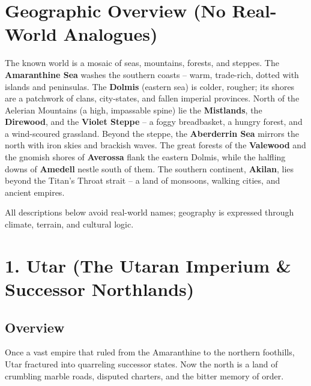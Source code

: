 \documentclass[11pt]{article}
\begin{document}
\section*{Geographic Overview (No Real-World Analogues)}
The known world is a mosaic of seas, mountains, forests, and steppes.  
The \textbf{Amaranthine Sea} washes the southern coasts -- warm, trade-rich, dotted with islands and peninsulas.  
The \textbf{Dolmis} (eastern sea) is colder, rougher; its shores are a patchwork of clans, city-states, and fallen imperial provinces.  
North of the Aelerian Mountains (a high, impassable spine) lie the \textbf{Mistlands}, the \textbf{Direwood}, and the \textbf{Violet Steppe} -- a foggy breadbasket, a hungry forest, and a wind-scoured grassland.  
Beyond the steppe, the \textbf{Aberderrin Sea} mirrors the north with iron skies and brackish waves.  
The great forests of the \textbf{Valewood} and the gnomish shores of \textbf{Averossa} flank the eastern Dolmis, while the halfling downs of \textbf{Amedell} nestle south of them.  
The southern continent, \textbf{Akilan}, lies beyond the Titan's Throat strait -- a land of monsoons, walking cities, and ancient empires.  

All descriptions below avoid real-world names; geography is expressed through climate, terrain, and cultural logic.

\section*{1. Utar (The Utaran Imperium \& Successor Northlands)}

\subsection*{Overview}
Once a vast empire that ruled from the Amaranthine to the northern foothills, Utar fractured into quarreling successor states. Now the north is a land of crumbling marble roads, disputed charters, and the bitter memory of order.
\end{document}
